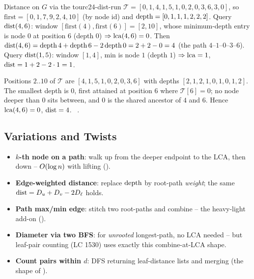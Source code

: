 \begin{example}{Distance on $G$ via the tour}{c24-dist-run}
$\mathcal{T}=[0,1,4,1,5,1,0,2,0,3,6,3,0]$, so
$\mathrm{first}=[0,1,7,9,2,4,10]$ (by node id) and
$\operatorname{depth}=[0,1,1,1,2,2,2]$. Query $\operatorname{dist}(4,6)$: window
$[\mathrm{first}(4),\mathrm{first}(6)]=[2,10]$, whose minimum-depth entry is node $0$ at
position $6$ (depth $0$) $\Rightarrow \operatorname{lca}(4,6)=0$. Then $\operatorname{dist}(4,6)=\operatorname{depth}4+\operatorname{depth}6-
2\operatorname{depth}0 = 2+2-0 = 4$ (the path $4$--$1$--$0$--$3$--$6$). Query $\operatorname{dist}(1,5)$: window $[1,4]$,
min is node $1$ (depth $1$) $\Rightarrow \operatorname{lca}=1$, $\operatorname{dist}=1+2-2\cdot1=1$.
\end{example}
\begin{tracebox}
Positions $2..10$ of $\mathcal{T}$ are $[4,1,5,1,0,2,0,3,6]$ with depths
$[2,1,2,1,0,1,0,1,2]$. The smallest depth is $0$, first attained at position $6$ where
$\mathcal{T}[6]=0$; no node deeper than $0$ sits between, and $0$ is the shared ancestor of
$4$ and $6$. Hence $\operatorname{lca}(4,6)=0$, $\operatorname{dist}=4$. \checkmark\ .
\end{tracebox}

\subsection{Variations and Twists}

\begin{itemize}[nosep]
  \item \textbf{$k$-th node on a path}: walk up from the deeper endpoint to the LCA, then
        down -- $O(\log n)$ with lifting ().                     \hfill{}
  \item \textbf{Edge-weighted distance}: replace $\operatorname{depth}$ by root-path \emph{weight}; the
        same $\operatorname{dist} = D_u + D_v - 2D_{\ell}$ holds.                          \hfill{}
  \item \textbf{Path max/min edge}: stitch two root-paths and combine -- the heavy-light
        add-on ().                                                  \hfill{}
  \item \textbf{Diameter via two BFS}: for \emph{unrooted} longest-path, no LCA needed -- but
        leaf-pair counting (LC 1530) uses exactly this combine-at-LCA shape.     \hfill{}
  \item \textbf{Count pairs within $d$}: DFS returning leaf-distance lists and merging
        (the shape of ).                                 \hfill{}
\end{itemize}

